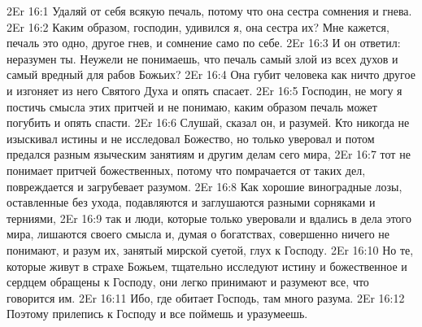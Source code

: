 \vs 2Er 16:1
Удаляй от себя всякую печаль, потому что она сестра сомнения и гнева.
\vs 2Er 16:2
Каким образом, господин,
удивился я, она сестра их? Мне кажется, печаль это одно, другое гнев, и
сомнение само по себе.
\vs 2Er 16:3
И он ответил: неразумен
ты. Неужели не понимаешь, что печаль самый злой из всех духов и самый
вредный для рабов Божьих?
\vs 2Er 16:4
Она губит человека как
ничто другое и изгоняет из него Святого Духа и опять спасает.
\vs 2Er 16:5
Господин, не могу я
постичь смысла этих притчей и не понимаю, каким образом печаль может погубить
и опять спасти.
\vs 2Er 16:6
Слушай, сказал он, и
разумей. Кто никогда не изыскивал истины и не исследовал Божество, но только
уверовал и потом предался разным языческим занятиям и другим делам сего мира,
\vs 2Er 16:7
тот не понимает притчей
божественных, потому что помрачается от таких дел, повреждается и загрубевает
разумом.
\vs 2Er 16:8
Как хорошие виноградные
лозы, оставленные без ухода, подавляются и заглушаются разными сорняками и
терниями,
\vs 2Er 16:9
так и люди, которые только
уверовали и вдались в дела этого мира, лишаются своего смысла и, думая о
богатствах, совершенно ничего не понимают, и разум их, занятый мирской суетой,
глух к Господу.
\vs 2Er 16:10
Но те, которые живут в
страхе Божьем, тщательно исследуют истину и божественное и сердцем обращены к
Господу, они легко принимают и разумеют все, что говорится им.
\vs 2Er 16:11
Ибо, где обитает Господь,
там много разума.
\vs 2Er 16:12
Поэтому прилепись к
Господу и все поймешь и уразумеешь.

